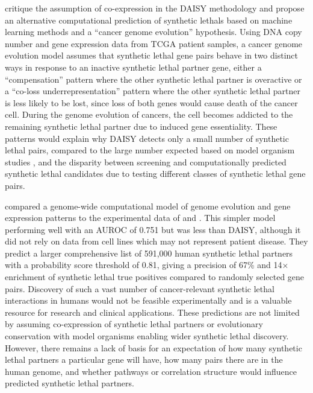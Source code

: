 \citet{Lu2015} critique the assumption of co-expression in the \gls{DAISY} methodology and propose an alternative computational prediction of \glspl{synthetic lethal} based on machine learning methods and a ``cancer genome evolution'' hypothesis. Using DNA copy number and gene expression data from \gls{TCGA} patient samples, a cancer genome evolution model assumes that \gls{synthetic lethal} gene pairs behave in two distinct ways in response to an inactive \gls{synthetic lethal} partner gene, either a ``compensation'' pattern where the other \gls{synthetic lethal} partner is overactive or a ``co-loss underrepresentation'' pattern where the other \gls{synthetic lethal} partner is less likely to be lost, since loss of both genes would cause death of the cancer cell. During the genome evolution of cancers, the cell becomes addicted to the remaining \gls{synthetic lethal} partner due to induced gene essentiality. These patterns would explain why \gls{DAISY} detects only a small number of \gls{synthetic lethal} pairs, compared to the large number expected based on model organism studies \citep{Boone2007}, and the disparity between screening and computationally predicted \gls{synthetic lethal} candidates due to testing different classes of \gls{synthetic lethal} gene pairs. 

\citet{Lu2015} compared a genome-wide computational model of genome evolution and gene expression patterns to the experimental data of \citet{Vizeacoumar2013} and \citet{Laufer2013}. This simpler model performing well with an \gls{AUROC} of 0.751 but was less than \gls{DAISY}, although it did not rely on data from cell lines which may not represent patient disease. They predict a larger comprehensive list of 591,000 human \gls{synthetic lethal} partners with a probability score threshold of 0.81, giving a precision of 67\% and 14$\times$ enrichment of \gls{synthetic lethal} true positives compared to randomly selected gene pairs. Discovery of such a vast number of cancer-relevant \gls{synthetic lethal} interactions in humans would not be feasible experimentally and is a valuable resource for research and clinical applications. These predictions are not limited by assuming co-expression of \gls{synthetic lethal} partners or evolutionary conservation with model organisms enabling wider \gls{synthetic lethal} discovery. However, there remains a lack of basis for an expectation of how many \gls{synthetic lethal} partners a particular gene will have, how many pairs there are in the human genome, and whether pathways or correlation structure would influence predicted \gls{synthetic lethal} partners. 


